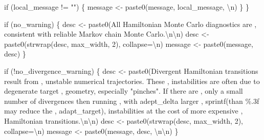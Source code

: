 \documentclass[
  letterpaper,
  DIV=11,
  numbers=noendperiod]{scrartcl}
\newenvironment{Shaded}{\begin{snugshade}}{\end{snugshade}}
\newcommand{\CharTok}[1]{\textcolor[rgb]{0.13,0.47,0.30}{#1}}
\newcommand{\ControlFlowTok}[1]{\textcolor[rgb]{0.00,0.23,0.31}{#1}}
\newcommand{\DecValTok}[1]{\textcolor[rgb]{0.68,0.00,0.00}{#1}}
\newcommand{\NormalTok}[1]{\textcolor[rgb]{0.00,0.23,0.31}{#1}}
\newcommand{\OperatorTok}[1]{\textcolor[rgb]{0.37,0.37,0.37}{#1}}
\newcommand{\SpecialCharTok}[1]{\textcolor[rgb]{0.37,0.37,0.37}{#1}}
\newcommand{\StringTok}[1]{\textcolor[rgb]{0.13,0.47,0.30}{#1}}
\begin{document}
\begin{Shaded}
\begin{Highlighting}[]
    \ControlFlowTok{if}\NormalTok{ (local\_message }\OperatorTok{!=} \StringTok{""}\NormalTok{) \{}
\NormalTok{      message }\OperatorTok{\textless{}{-}}\NormalTok{ paste0(message, local\_message, }\StringTok{\textquotesingle{}}\CharTok{\textbackslash{}n}\StringTok{\textquotesingle{}}\NormalTok{)}
\NormalTok{    \}}
\NormalTok{  \}}

  \ControlFlowTok{if}\NormalTok{ (no\_warning) \{}
\NormalTok{    desc }\OperatorTok{\textless{}{-}}\NormalTok{ paste0(}\StringTok{\textquotesingle{}All Hamiltonian Monte Carlo diagnostics are \textquotesingle{}}\NormalTok{,}
                   \StringTok{\textquotesingle{}consistent with reliable Markov chain Monte Carlo.}\CharTok{\textbackslash{}n\textbackslash{}n}\StringTok{\textquotesingle{}}\NormalTok{)}
\NormalTok{    desc }\OperatorTok{\textless{}{-}}\NormalTok{ paste0(strwrap(desc, max\_width, }\DecValTok{2}\NormalTok{), collapse}\OperatorTok{=}\StringTok{\textquotesingle{}}\CharTok{\textbackslash{}n}\StringTok{\textquotesingle{}}\NormalTok{)}
\NormalTok{    message }\OperatorTok{\textless{}{-}}\NormalTok{ paste0(message, desc)}
\NormalTok{  \}}
  
  \ControlFlowTok{if}\NormalTok{ (}\OperatorTok{!}\NormalTok{no\_divergence\_warning) \{}
\NormalTok{    desc }\OperatorTok{\textless{}{-}}\NormalTok{ paste0(}\StringTok{\textquotesingle{}Divergent Hamiltonian transitions result from \textquotesingle{}}\NormalTok{,}
                   \StringTok{\textquotesingle{}unstable numerical trajectories.  These \textquotesingle{}}\NormalTok{,}
                   \StringTok{\textquotesingle{}instabilities are often due to degenerate target \textquotesingle{}}\NormalTok{,}
                   \StringTok{\textquotesingle{}geometry, especially "pinches".  If there are \textquotesingle{}}\NormalTok{,}
                   \StringTok{\textquotesingle{}only a small number of divergences then running \textquotesingle{}}\NormalTok{,}
                   \StringTok{\textquotesingle{}with adept\_delta larger \textquotesingle{}}\NormalTok{,}
\NormalTok{                   sprintf(}\StringTok{\textquotesingle{}than }\SpecialCharTok{\%.3f}\StringTok{ may reduce the \textquotesingle{}}\NormalTok{, adapt\_target),}
                   \StringTok{\textquotesingle{}instabilities at the cost of more expensive \textquotesingle{}}\NormalTok{,}
                   \StringTok{\textquotesingle{}Hamiltonian transitions.}\CharTok{\textbackslash{}n\textbackslash{}n}\StringTok{\textquotesingle{}}\NormalTok{)}
\NormalTok{    desc }\OperatorTok{\textless{}{-}}\NormalTok{ paste0(strwrap(desc, max\_width, }\DecValTok{2}\NormalTok{), collapse}\OperatorTok{=}\StringTok{\textquotesingle{}}\CharTok{\textbackslash{}n}\StringTok{\textquotesingle{}}\NormalTok{)}
\NormalTok{    message }\OperatorTok{\textless{}{-}}\NormalTok{ paste0(message, desc, }\StringTok{\textquotesingle{}}\CharTok{\textbackslash{}n\textbackslash{}n}\StringTok{\textquotesingle{}}\NormalTok{)}
\NormalTok{  \}}


\end{Highlighting}
\end{Shaded}
\end{document}
